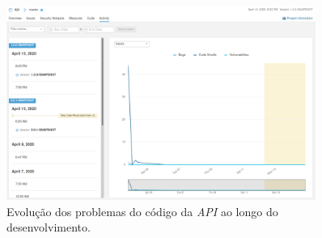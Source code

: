 \begin{figure}[h]
   \centering
   \includegraphics[width=0.90\textwidth]{images/sonar_activity}
   \caption{Evolução dos problemas do código da \textit{API} ao longo do desenvolvimento.}
   \label{fig:sonar_activity}
\end{figure}
